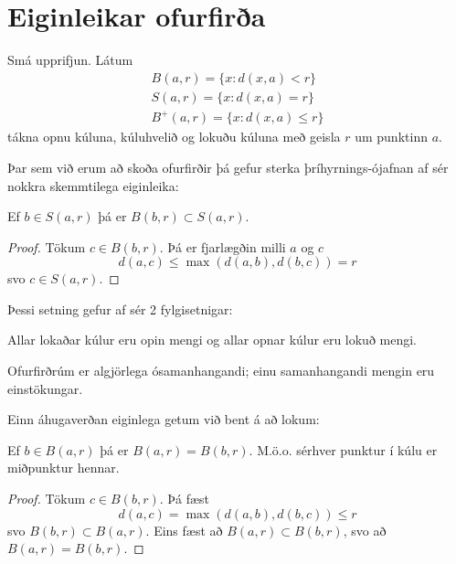 \section*{Eiginleikar ofurfirða}
\begin{skilgr}
Smá upprifjun. Látum
\begin{align*}
B(a,r) = \{x:d(x,a)<r\} \\
S(a,r) = \{x:d(x,a) = r\} \\
B^+(a,r) = \{x:d(x,a) \leq r\}
\end{align*}
tákna opnu kúluna, kúluhvelið og lokuðu kúluna með geisla $r$ um punktinn $a$.
\end{skilgr}
Þar sem við erum að skoða ofurfirðir þá gefur sterka þríhyrnings-ójafnan af sér nokkra skemmtilega eiginleika:
\begin{setn}
Ef $b \in S(a,r)$ þá er $B(b,r) \subset S(a,r)$.
\end{setn}
\begin{proof}
Tökum $c \in B(b,r)$. Þá er fjarlægðin milli $a$ og $c$
\begin{equation*}
d(a,c) \leq \max(d(a,b),d(b,c)) = r 
\end{equation*}
svo $c \in S(a,r)$.
\end{proof}
Þessi setning gefur af sér 2 fylgisetnigar:
\begin{fylgisetn}
Allar lokaðar kúlur eru opin mengi og allar opnar kúlur eru lokuð mengi.
\end{fylgisetn}
\begin{fylgisetn} 
Ofurfirðrúm er algjörlega ósamanhangandi; einu samanhangandi mengin eru einstökungar.
\end{fylgisetn}
Einn áhugaverðan eiginlega getum við bent á að lokum:
\begin{setn}
Ef $b\in B(a,r)$ þá er $B(a,r) = B(b,r)$. M.ö.o. sérhver punktur í kúlu er miðpunktur hennar.
\end{setn}
\begin{proof}
Tökum $c\in B(b,r)$. Þá fæst
\begin{equation*}
d(a,c) = \max (d(a,b),d(b,c)) \leq r
\end{equation*}
svo $B(b,r) \subset B(a,r)$. Eins fæst að $B(a,r) \subset B(b,r)$, svo að $B(a,r) = B(b,r)$.
\end{proof}


